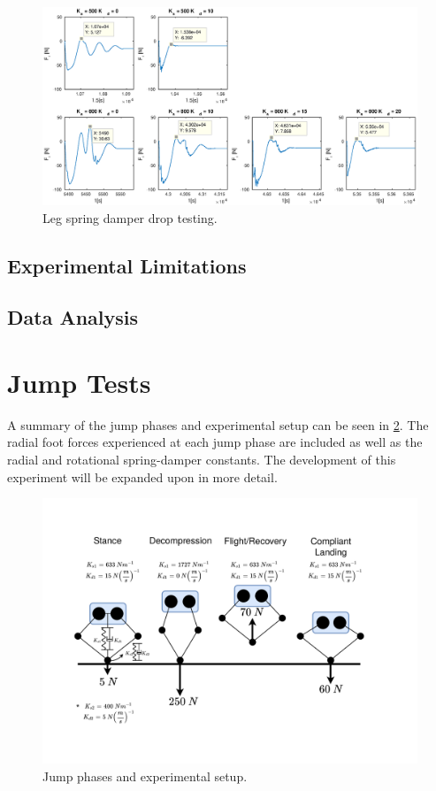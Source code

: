 \begin{figure}
\centering
\includegraphics[width=1\textwidth]{images/experiments/drop-test-force-plots.eps} 
\caption{Leg spring damper drop testing.}
\label{fig:drop-tests}
\end{figure}

\subsection{Experimental Limitations}

\subsection{Data Analysis}

\section{Jump Tests}

A summary of the jump phases and experimental setup can be seen in \cref{fig:jump-phases-experiment}. The radial foot forces experienced at each jump phase are included as well as the radial and rotational spring-damper constants. The development of this experiment will be expanded upon in more detail.

\begin{figure}
\centering
\includegraphics[clip, trim = 2.5cm 2cm 4cm 2cm, width=1\textwidth]{images/experiments/jump/jump-phases.pdf} 
\caption{Jump phases and experimental setup.}
\label{fig:jump-phases-experiment}
\end{figure}

